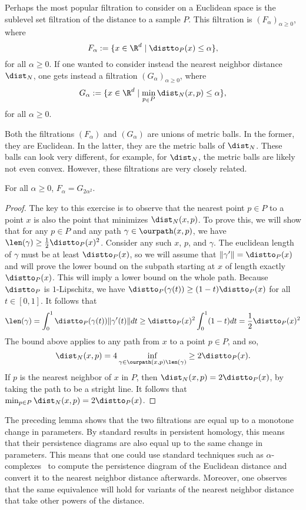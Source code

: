     Perhaps the most popular filtration to consider on a Euclidean space is the sublevel set filtration of the distance to a sample $P$.
    This filtration is $(F_\alpha)_{\alpha\ge 0}$, where
    \[
      F_\alpha := \{x\in \R^d \mid \distto_P(x) \le \alpha\},
    \]
    for all $\alpha \ge 0$.
    If one wanted to consider instead the nearest neighbor distance $\dist_N$, one gets instead a filtration $(G_\alpha)_{\alpha\ge 0}$, where
    \[
      G_\alpha := \{x\in \R^d \mid \min_{p_\in P} \dist_N(x,p) \le \alpha\},
    \]
    for all $\alpha \ge 0$.

    Both the filtrations $(F_\alpha)$ and $(G_\alpha)$ are unions of metric balls.
    In the former, they are Euclidean.
    In the latter, they are the metric balls of $\dist_N$.
    These balls can look very different, for example, for $\dist_N$, the metric balls are likely not even convex.
    However, these filtrations are very closely related.
    \begin{lemma}
      For all $\alpha \ge 0$, $F_\alpha = G_{2\alpha^2}$.
    \end{lemma}
    \begin{proof}
      The key to this exercise is to observe that the nearest point $p \in P$ to a point $x$ is also the point that minimizes $\dist_N(x,p)$.
      To prove this, we will show that for any $p\in P$ and any path $\gamma\in \ourpath(x,p)$, we have $\len(\gamma)\ge \frac{1}{2}\distto_P(x)^2$.
      Consider any such $x$, $p$, and $\gamma$.
      The euclidean length of $\gamma$ must be at least $\distto_P(x)$, so we will assume that $\|\gamma'\| = \distto_P(x)$ and will prove the lower bound on the subpath starting at $x$ of length exactly $\distto_P(x)$.
      This will imply a lower bound on the whole path.
      Because $\distto_P$ is $1$-Lipschitz, we have $\distto_P(\gamma(t))\ge (1-t)\distto_P(x)$ for all $t\in [0,1]$.  It follows that
      \[
        \len(\gamma) = \int_0^1 \distto_P(\gamma(t))\|\gamma'(t)\|dt
          \ge \distto_P(x)^2 \int_0^1 (1-t)dt
          =  \frac{1}{2}\distto_P(x)^2
      \]
      The bound above applies to any path from $x$ to a point $p\in P$, and so,
      \[
        \dist_N(x,p) = 4 \inf_{\gamma\in \ourpath(x,p) \len(\gamma)} \ge 2\distto_P(x).
      \]
      If $p$ is the nearest neighbor of $x$ in $P$, then $\dist_N(x,p) = 2\distto_P(x)$, by taking the path to be a stright line.
      It follows that $\min_{p\in P}\dist_N(x,p) = 2\distto_P(x)$.
    \end{proof}

    The preceding lemma shows that the two filtrations are equal up to a monotone change in parameters.
    By standard results in persistent homology, this means that their persistence diagrams are also equal up to the same change in parameters.
    This means that one could use standard techniques such as $\alpha$-complexes~\cite{edelsbrunner02topological} to compute the persistence diagram of the Euclidean distance and convert it to the nearest neighbor distance afterwards.
    Moreover, one observes that the same equivalence will hold for variants of the nearest neighbor distance that take other powers of the distance.

